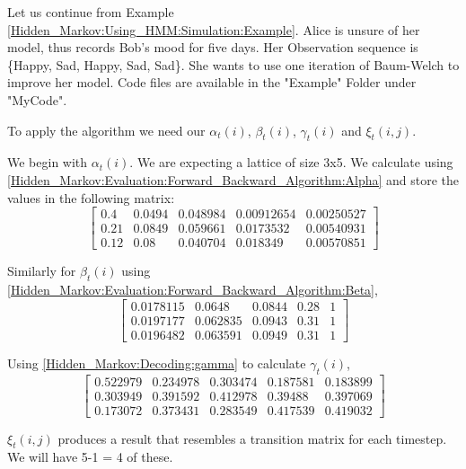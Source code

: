     \begin{example}
        Let us continue from Example \ref{Hidden_Markov:Using_HMM:Simulation:Example}. Alice is unsure of her model, thus records Bob's mood for five days. Her Observation sequence is \{Happy, Sad, Happy, Sad, Sad\}. She wants to use one iteration of Baum-Welch to improve her model. Code files are available in the "Example" Folder under "MyCode".

        To apply the algorithm we need our $\alpha_t(i)$, $\beta_t(i)$, $\gamma_t(i)$ and $\xi_t(i,j)$. 

        We begin with $\alpha_t(i)$. We are expecting a lattice of size 3x5. We calculate using \ref{Hidden_Markov:Evaluation:Forward_Backward_Algorithm:Alpha} and store the values in the following matrix:
        \[
            \begin{bmatrix}
                0.4  &  0.0494  & 0.048984 & 0.00912654 &  0.00250527 \\ 
                0.21 &  0.0849  & 0.059661 & 0.0173532  &  0.00540931 \\
                0.12 &  0.08    & 0.040704 & 0.018349   & 0.00570851  
            \end{bmatrix}
        \]
        
        Similarly for $\beta_t(i)$ using \ref{Hidden_Markov:Evaluation:Forward_Backward_Algorithm:Beta},
        \[
            \begin{bmatrix}
                0.0178115 & 0.0648   & 0.0844 & 0.28  & 1 \\
                0.0197177 & 0.062835 & 0.0943 & 0.31 &  1 \\
                0.0196482 & 0.063591 & 0.0949 & 0.31 & 1 
            \end{bmatrix}
        \]
        
        Using \ref{Hidden_Markov:Decoding:gamma} to calculate $\gamma_t(i)$,
        \[
            \begin{bmatrix}
                0.522979 & 0.234978 & 0.303474 & 0.187581 &  0.183899 \\ 
                0.303949 & 0.391592 & 0.412978 & 0.39488  & 0.397069  \\
                0.173072 & 0.373431 & 0.283549 & 0.417539 &  0.419032 
            \end{bmatrix}
        \]

        $\xi_t(i,j)$ produces a result that resembles a transition matrix for each timestep. We will have 5-1 = 4 of these.


\end{example}
